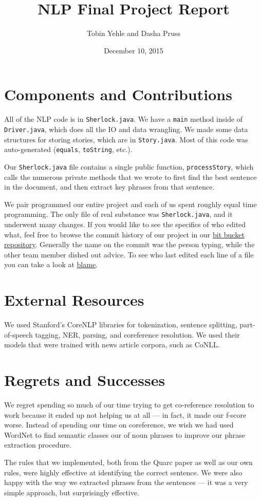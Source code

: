 \documentclass[twoside,12pt]{article}
\newcommand{\class}{NLP}
\newcommand{\name}{Final Project Report}
\newcommand{\due}{December 10, 2015}
\newcommand{\code}[1]{\texttt{#1}}
\begin{document}
\date{\due}
\title{\class{} \name }
\author{ Tobin Yehle and Dasha Pruss}
\maketitle


\section{Components and Contributions}

All of the NLP code is in \code{Sherlock.java}. We have a \code{main} method inside of \code{Driver.java}, which does all the IO and data wrangling. We made some data structures for storing stories, which are in \code{Story.java}. Most of this code was auto-generated (\code{equals}, \code{toString}, etc.).

Our \code{Sherlock.java} file contains a single public function, \code{processStory}, which calls the numerous private methods that we wrote to first find the best sentence in the document, and then extract key phrases from that sentence.

We pair programmed our entire project and each of us spent roughly equal time programming. The only file of real substance was \code{Sherlock.java}, and it underwent many changes. If you would like to see the specifics of who edited what, feel free to browse the commit history of our project in our
\href{https://bitbucket.org/tobinyehle/sherlock/commits/all}{bit bucket repository}. Generally the name on the commit was the person typing, while the other team member dished out advice.
To see who last edited each line of a file you can take a look at
\href{https://bitbucket.org/tobinyehle/sherlock/annotate/e57a8467bc90e614b13ca2c99f0b5d681baa65c9/src/cs/utah/sherlock/Sherlock.java?at=default&fileviewer=file-view-default}{blame}.

\section{External Resources}

We used Stanford's CoreNLP libraries for tokenization, sentence splitting, part-of-speech tagging, NER, parsing, and coreference resolution. We used their models that were trained with news article corpora, such as CoNLL.

\section{Regrets and Successes}

We regret spending so much of our time trying to get co-reference resolution to work because it ended up not helping us at all --- in fact, it made our f-score worse. Instead of spending our time on coreference, we wish we had used WordNet to find semantic classes our of noun phrases to improve our phrase extraction procedure.

The rules that we implemented, both from the Quarc paper as well as our own rules, were highly effective at identifying the correct sentence. We were also happy with the way we extracted phrases from the sentences --- it was a very simple approach, but surprisingly effective.
\end{document}
